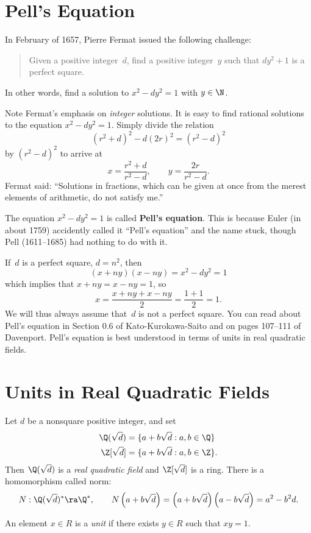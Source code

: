 \documentclass[11pt]{report}
\begin{document}
\section{Pell's Equation}
In February of 1657, Pierre Fermat issued the following challenge:
\begin{quote}
  Given a positive integer~$d$, find a positive integer~$y$ such that
  $dy^2 + 1$ is a perfect square.
\end{quote}
In other words, find a solution to $x^2-dy^2 = 1$ with $y\in\N$.


Note Fermat's emphasis on {\em integer} solutions.  It is
easy to find rational solutions to the equation $x^2-dy^2 = 1$.
Simply divide the relation
$$
  (r^2+d)^2 - d(2r)^2 = (r^2-d)^2
$$
by $(r^2 - d)^2$ to arrive at
$$
  x = \frac{r^2+d}{r^2-d}, \qquad
  y = \frac{2r}{r^2-d}.
$$
Fermat said: ``Solutions in fractions, which can be given at
once from the merest elements of arithmetic, do not satisfy me.''

The equation $x^2 - dy^2=1$ is called {\bf Pell's equation}.  This is
because Euler (in about 1759) accidently called it ``Pell's equation''
and the name stuck, though Pell (1611--1685) had nothing
to do with it.

If~$d$ is a perfect square, $d=n^2$, then
$$
  (x+ny)(x-ny) = x^2-dy^2 = 1
$$
which implies that
$x+ny = x-ny = 1$, so
$$
  x = \frac{x+ny+x-ny}{2} = \frac{1+1}{2}=1.
$$
We will thus always assume that~$d$ is not a perfect square.
You can read about Pell's equation in Section 0.6 of Kato-Kurokawa-Saito
and on pages 107--111 of Davenport.  Pell's equation is
best understood in terms of units in real quadratic fields.

\section{Units in Real Quadratic Fields}
Let $d$ be a nonsquare positive integer, and set
\begin{align*}
  \Q(\sqrt{d}) & = \{a + b\sqrt{d} : a, b\in\Q\}  \\
  \Z[\sqrt{d}] & = \{a + b\sqrt{d} : a, b\in\Z\}.
\end{align*}
Then $\Q(\sqrt{d})$ is a {\em real quadratic field} and
$\Z[\sqrt{d}]$ is a ring.
There is a homomorphism called norm:
$$
  N : \Q(\sqrt{d})^* \ra \Q^*,
  \qquad
  N\left(a+b\sqrt{d}\right) = \left(a+b\sqrt{d}\right)\left(a-b\sqrt{d}\right) = a^2 - b^2 d.
$$
\begin{definition}
  An element $x\in R$ is a {\em unit} if there exists $y\in{}R$
  such that $xy=1$.
\end{definition}
\end{document}
